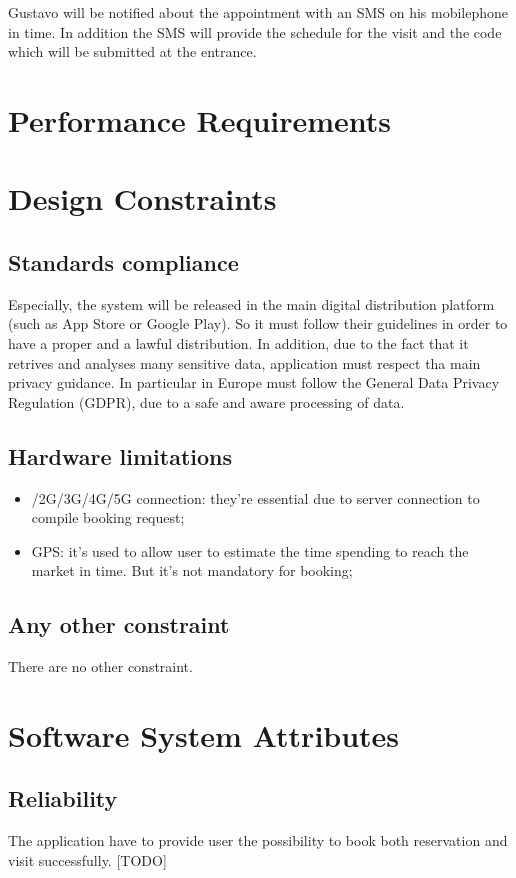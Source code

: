 Gustavo will be notified about the appointment with an SMS on his mobilephone in time. In addition the SMS will provide the schedule for the visit and the code which will be submitted at the entrance.



\section{Performance Requirements}
\section{Design Constraints}
\subsection{Standards compliance}
Especially, the system will be released in the main digital distribution platform (such as App Store or Google Play). So it must follow their guidelines in order to have a proper and a lawful distribution. In addition, due to the fact that it retrives and analyses many sensitive data, application must respect tha main privacy guidance. In particular in Europe must follow the General Data Privacy Regulation (GDPR), due to a safe and aware processing of data. 
\subsection{Hardware limitations}
\begin{itemize}
\item /2G/3G/4G/5G connection: they're essential due to server connection to compile booking request;
\item GPS: it's used to allow user to estimate the time spending to reach the market in time. But it's not mandatory for booking;
\end{itemize}
\subsection{Any other constraint}
There are no other constraint.
\section{Software System Attributes}
\subsection{Reliability}
The application have to provide user the possibility to book both reservation and visit successfully. [TODO] 

